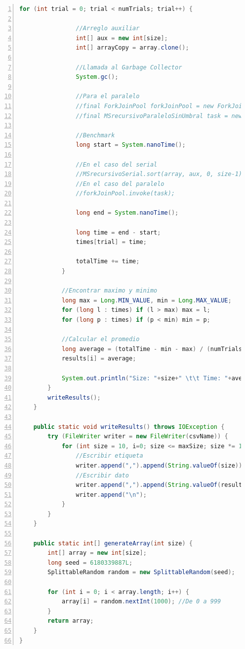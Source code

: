 \documentclass[titlepage]{article}
\begin{document}
\newpage
\begin{lstlisting}[language=java, frame=single,numbers=left, float=h!, breaklines=true]
            for (int trial = 0; trial < numTrials; trial++) {
	
				//Arreglo auxiliar
				int[] aux = new int[size];
				int[] arrayCopy = array.clone();
				
				//Llamada al Garbage Collector
				System.gc();
				
				//Para el paralelo
				//final ForkJoinPool forkJoinPool = new ForkJoinPool(parallelismLevel);
				//final MSrecursivoParaleloSinUmbral task = new MSrecursivoParaleloSinUmbral(arrayCopy, aux, 0, size-1);
				
				//Benchmark
				long start = System.nanoTime();
				
				//En el caso del serial
				//MSrecursivoSerial.sort(array, aux, 0, size-1);
				//En el caso del paralelo
				//forkJoinPool.invoke(task);
				
				long end = System.nanoTime();
				
				long time = end - start;
				times[trial] = time;
				
				totalTime += time;
			}

			//Encontrar maximo y minimo
			long max = Long.MIN_VALUE, min = Long.MAX_VALUE;
			for (long l : times) if (l > max) max = l;
			for (long p : times) if (p < min) min = p;
			
			//Calcular el promedio
			long average = (totalTime - min - max) / (numTrials - 2);
			results[i] = average;
			
			System.out.println("Size: "+size+" \t\t Time: "+average);
		}
		writeResults();
	}

	public static void writeResults() throws IOException {
		try (FileWriter writer = new FileWriter(csvName)) {
			for (int size = 10, i=0; size <= maxSize; size *= 10, i++) {
				//Escribir etiqueta
				writer.append(",").append(String.valueOf(size));
				//Escribir dato
				writer.append(",").append(String.valueOf(results[i]));
				writer.append("\n");
			}
		}
	}

	public static int[] generateArray(int size) {
		int[] array = new int[size];
		long seed = 6180339887L;
		SplittableRandom random = new SplittableRandom(seed);
		
		for (int i = 0; i < array.length; i++) {
			array[i] = random.nextInt(1000); //De 0 a 999
		}
		return array;
	}
}	
\end{lstlisting}
\end{document}
